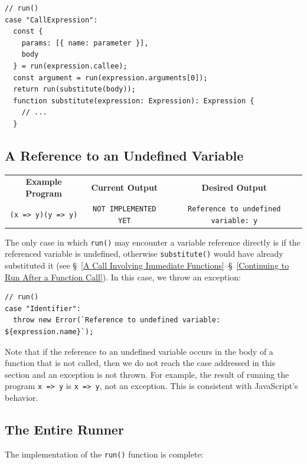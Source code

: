 \documentclass[12pt, oneside]{book}
\begin{document}
\begin{verbatim}
// run()
case "CallExpression":
  const {
    params: [{ name: parameter }],
    body
  } = run(expression.callee);
  const argument = run(expression.arguments[0]);
  return run(substitute(body));
  function substitute(expression: Expression): Expression {
    // ...
  }
\end{verbatim}

\subsection{A Reference to an Undefined Variable}

\begin{center}
\begin{tabular}{c|c|c}
\textbf{Example Program} & \textbf{Current Output} & \textbf{Desired Output} \\
\texttt{(x => y)(y => y)} & \texttt{NOT IMPLEMENTED YET} & \texttt{Reference to undefined variable: y} \\
\end{tabular}
\end{center}

The only case in which \texttt{run()} may encounter a variable reference directly is if the referenced variable is undefined, otherwise \texttt{substitute()} would have already substituted it (see §~\ref{A Call Involving Immediate Functions}–§~\ref{Continuing to Run After a Function Call}). In this case, we throw an exception:

\begin{verbatim}
// run()
case "Identifier":
  throw new Error(`Reference to undefined variable: ${expression.name}`);
\end{verbatim}

Note that if the reference to an undefined variable occurs in the body of a function that is not called, then we do not reach the case addressed in this section and an exception is not thrown. For example, the result of running the program \texttt{x => y} is \texttt{x => y}, not an exception. This is consistent with JavaScript’s behavior.

\subsection{The Entire Runner}
\label{The Entire Runner}

The implementation of the \texttt{run()} function is complete:
\end{document}

